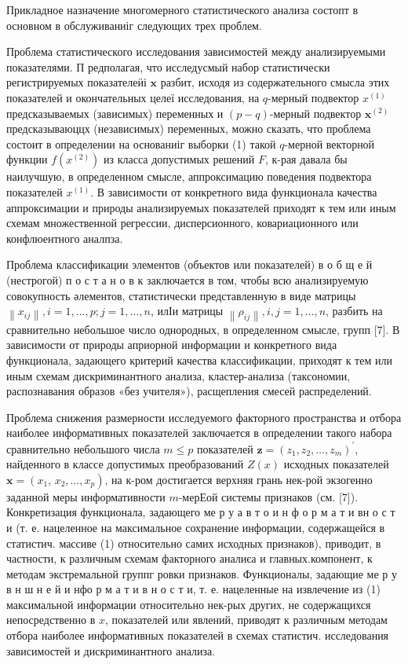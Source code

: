 \documentclass[10pt]{article}
\begin{document}
Прикладное назначение многомерного статистического анализа состопт в основном в обслуживаниіг следующих трех проблем.



Проблема статистического исследования зависимостей между анализируемыми показателями. П редполагая, что исследусмый набор статистически регистрируемых показателеӥі $\boldsymbol{x}$ разбит, исходя из содержательного смысла этих показателей и окончательных целеї исследования, на $q$-мерный подвектор $x^{(1)}$ предсказываемых (зависимых) переменных и $(p-q)$-мерный подвектор $\boldsymbol{x}^{(2)}$ предсказываюццх (независимых) переменных, можно сказать, что проблема состоит в определении на основаниіг выборки (1) такой $q$-мерной векторной функции $f\left(x^{(2)}\right)$ из класса допустимых решений $F$, к-рая давала бы наилучшую, в определенном смысле, аппроксимацию поведения подвектора показателей $x^{(1)}$. В зависимости от конкретного вида функционала качества аппроксимации и природы анализируемых показателей приходят к тем или иным схемам множественной регрессии, дисперсионного, ковариационного или конфлюентного аналпза.



Проблема классификации элементов (объектов или показателей) в о б щ е й (нестрогой) п о с т а н о в к заключается в том, чтобы всю анализируемую совокупность әлементов, статистически представленную в виде матрицы $\left\|x_{i j}\right\|, i=1, \ldots, p ; j=1, \ldots, n$, илІи матрицы $\left\|\rho_{i j}\right\|, i, j=1, \ldots, n$, разбить на сравнительно небольшое число однородных, в определенном смысле, групп [7]. В зависимости от природы априорной информации и конкретного вида функционала, задающего критерий качества классификации, приходят к тем или иным схемам дискриминантного анализа, кластер-анализа (таксономии, распознавания образов «без учителя»), расщепления смесей распределений.



Проблема снижения размерности исследуемого факторного пространства и отбора наиболее информативных показателей заключается в определении такого набора сравнительно небольшого числа $m \leqslant p$ показателей $\boldsymbol{z}=\left(z_{1}, z_{2}, \ldots, z_{m}\right)^{\prime}$, найденного в классе допустимых преобразований $Z(x)$ исходных показателей $\boldsymbol{x}=\left(x_{1}\right.$, $\left.x_{2}, \ldots, x_{p}\right)$, на к-ром достигается верхняя грань нек-рой экзогенно заданной меры информативности $m$-мерЕой системы признаков (см. [7]). Конкретизация функционала, задающего ме р у а в т о и н ф о р м а т и вн о с т и (т. е. нацеленное на максимальное сохранение информации, содержащейся в статистич. массиве (1) относительно самих исходных признаков), приводит, в частности, к различным схемам факторного аналиєа и главных.компонент, к методам экстремальной группг ровки признаков. Функционалы, задающие ме р у в н ш н е й и нфо р м а т и в н о с т и, т. е. нацеленные на извлечение из (1) максимальной информации относительно нек-рых других, не содержащихся непосредственно в $x$, показателей или явлений, приводят к различным методам отбора наиболее информативных показателей в схемах статистич. исследования зависимостей и дискриминантного анализа.
\end{document}
